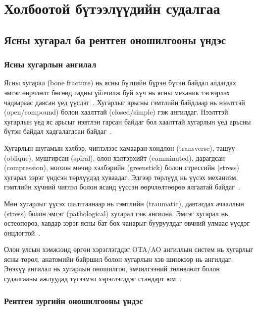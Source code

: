 
\chapter{Холбоотой бүтээлүүдийн судалгаа}
\label{Chapter2}
\pagecolor{Beige}

\section{Ясны хугарал ба рентген оношилгооны үндэс}

\subsection*{Ясны хугарлын ангилал}

Ясны хугарал (bone fracture) нь ясны бүтцийн бүрэн бүтэн байдал алдагдах эмгэг өөрчлөлт бөгөөд гадны үйлчилж буй хүч нь ясны механик тэсвэрлэх чадвараас давсан үед үүсдэг~\cite{ref22}. Хугарлыг арьсны гэмтлийн байдлаар нь нээлттэй (open/compound) болон хаалттай (closed/simple) гэж ангилдаг. Нээлттэй хугарлын үед яс арьсыг нэвтлэн гарсан байдаг бол хаалттай хугарлын үед арьсны бүтэн байдал хадгалагдсан байдаг~\cite{ref22}.

Хугарлын шугамын хэлбэр, чиглэлээс хамааран хөндлөн (transverse), ташуу (oblique), мушгирсан (spiral), олон хэлтэрхийт (comminuted), дарагдсан (compression), ногоон мөчир хэлбэрийн (greenstick) болон стрессийн (stress) хугарал зэрэг үндсэн төрлүүдэд хуваадаг. Эдгээр төрлүүд нь үүсэх механизм, гэмтлийн хүчний чиглэл болон ясанд үүссэн өөрчлөлтөөрөө ялгаатай байдаг~\cite{ref22,ref23}.

Мөн хугарлыг үүсэх шалтгаанаар нь гэмтлийн (traumatic), давтагдах ачааллын (stress) болон эмгэг (pathological) хугарал гэж ангилна. Эмгэг хугарал нь остеопороз, хавдар зэрэг ясны бат бөх чанарыг бууруулдаг өвчний улмаас үүсдэг онцлогтой~\cite{ref24}.

Олон улсын хэмжээнд өргөн хэрэглэгддэг OTA/AO ангиллын систем нь хугарлыг ясны төрөл, анатомийн байршил болон хугарлын хэв шинжээр нь ангилдаг. Энэхүү ангилал нь хугарлын оношилгоо, эмчилгээний төлөвлөлт болон судалгааны ажлуудад түгээмэл хэрэглэгддэг стандарт юм~\cite{ref25}.

\subsection*{Рентген зургийн оношилгооны үндэс}

